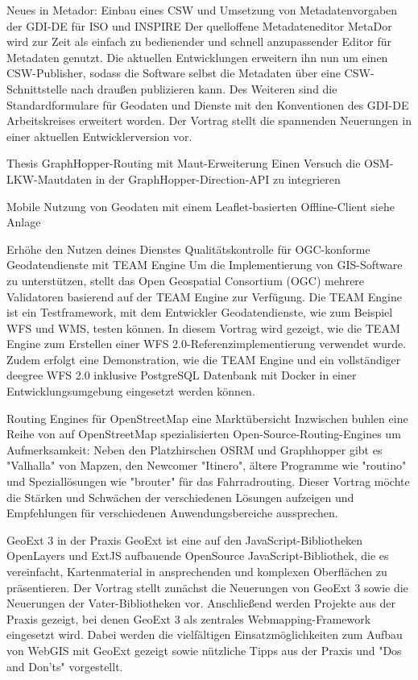 %
{Neues in Metador: Einbau eines CSW und Umsetzung von Metadatenvorgaben der GDI-DE für ISO und INSPIRE}%
{}%
{Der quelloffene Metadateneditor MetaDor wird zur Zeit als einfach zu bedienender und schnell
anzupassender Editor für Metadaten genutzt. Die aktuellen Entwicklungen erweitern ihn nun um einen
CSW-Publisher, sodass die Software selbst die Metadaten über eine CSW-Schnittstelle nach draußen
publizieren kann. Des Weiteren sind die Standardformulare für Geodaten und Dienste mit den
Konventionen des GDI-DE Arbeitskreises erweitert worden. Der Vortrag stellt die spannenden
Neuerungen in einer aktuellen Entwicklerversion vor.}

%
{Thesis GraphHopper-Routing mit Maut-Erweiterung}%
{Einen Versuch die OSM-LKW-Mautdaten in der GraphHopper-Direction-API zu integrieren}%
{}

%
{Mobile Nutzung von Geodaten mit einem Leaflet-basierten Offline-Client }%
{}%
{siehe Anlage}

%
{Erhöhe den Nutzen deines Dienstes}%
{Qualitätskontrolle für OGC-konforme Geodatendienste mit TEAM Engine}%
{Um die Implementierung von GIS-Software zu unterstützen, stellt das Open Geospatial Consortium
(OGC) mehrere Validatoren basierend auf der TEAM Engine zur Verfügung. Die TEAM Engine ist ein
Testframework, mit dem Entwickler Geodatendienste, wie zum Beispiel WFS und WMS, testen können.  In
diesem Vortrag wird gezeigt, wie die TEAM Engine zum Erstellen einer WFS 2.0-Referenzimplementierung
verwendet wurde. Zudem erfolgt eine Demonstration, wie die TEAM Engine und ein vollständiger deegree
WFS 2.0 inklusive PostgreSQL Datenbank mit Docker in einer Entwicklungsumgebung eingesetzt werden
können.}

%
{Routing Engines für OpenStreetMap}%
{eine Marktübersicht}%
{Inzwischen buhlen eine Reihe von auf OpenStreetMap spezialisierten Open-Source-Routing-Engines um
Aufmerksamkeit: Neben den Platzhirschen OSRM und Graphhopper gibt es "Valhalla" von Mapzen, den
Newcomer "Itinero", ältere Programme wie "routino" und Speziallösungen wie "brouter" für das
Fahrradrouting. Dieser Vortrag möchte die Stärken und Schwächen der verschiedenen Lösungen aufzeigen
und Empfehlungen für verschiedenen Anwendungsbereiche aussprechen. }



%
{GeoExt 3 in der Praxis}%
{}%
{GeoExt ist eine auf den JavaScript-Bibliotheken OpenLayers und ExtJS aufbauende OpenSource
  JavaScript-Bibliothek, die es vereinfacht, Kartenmaterial in ansprechenden und komplexen
  Oberflächen zu präsentieren.  Der Vortrag stellt zunächst die Neuerungen von GeoExt 3 sowie die
  Neuerungen der Vater-Bibliotheken
vor.  Anschließend werden Projekte aus der Praxis gezeigt, bei denen GeoExt 3 als zentrales
Webmapping-Framework eingesetzt wird. Dabei werden die vielfältigen Einsatzmöglichkeiten zum Aufbau
von WebGIS mit GeoExt gezeigt sowie nützliche Tipps aus der Praxis und "Dos and Don'ts"
vorgestellt.}

